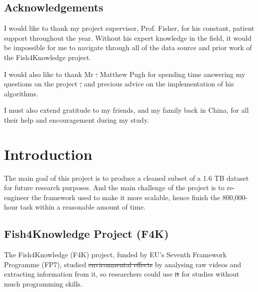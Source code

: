 \documentclass[bsc,logo,twoside,fullspacing,parskip]{infthesis}
\providecommand{\DIFadd}[1]{{\protect\color{blue}\uwave{#1}}} %
\providecommand{\DIFdel}[1]{{\protect\color{red}\sout{#1}}}                      %
\providecommand{\DIFaddbegin}{} %
\providecommand{\DIFaddend}{} %
\providecommand{\DIFdelbegin}{} %
\providecommand{\DIFdelend}{} %
\newcommand{\DIFscaledelfig}{0.5}
\newlength{\DIFdelgraphicswidth} %
\newlength{\DIFdelgraphicsheight} %
\newcommand{\DIFaddincludegraphics}[2][]{{\color{blue}\fbox{\DIFOincludegraphics[#1]{#2}}}} %
\newcommand{\DIFdelincludegraphics}[2][]{%
\sbox{\DIFdelgraphicsbox}{\DIFOincludegraphics[#1]{#2}}%
\settoboxwidth{\DIFdelgraphicswidth}{\DIFdelgraphicsbox} %
\settoboxtotalheight{\DIFdelgraphicsheight}{\DIFdelgraphicsbox} %
\scalebox{\DIFscaledelfig}{%
\parbox[b]{\DIFdelgraphicswidth}{\usebox{\DIFdelgraphicsbox}\\[-\baselineskip] \rule{\DIFdelgraphicswidth}{0em}}\llap{\resizebox{\DIFdelgraphicswidth}{\DIFdelgraphicsheight}{%
\setlength{\unitlength}{\DIFdelgraphicswidth}%
\begin{picture}(1,1)%
\thicklines\linethickness{2pt} %
{\color[rgb]{1,0,0}\put(0,0){\framebox(1,1){}}}%
{\color[rgb]{1,0,0}\put(0,0){\line( 1,1){1}}}%
{\color[rgb]{1,0,0}\put(0,1){\line(1,-1){1}}}%
\end{picture}%
}\hspace*{3pt}}} %
} %
\DeclareRobustCommand{\DIFaddbegin}{\DIFOaddbegin \let\includegraphics\DIFaddincludegraphics} %
\DeclareRobustCommand{\DIFaddend}{\DIFOaddend \let\includegraphics\DIFOincludegraphics} %
\DeclareRobustCommand{\DIFdelbegin}{\DIFOdelbegin \let\includegraphics\DIFdelincludegraphics} %
\DeclareRobustCommand{\DIFdelend}{\DIFOaddend \let\includegraphics\DIFOincludegraphics} %
\begin{document}
\maketitle

\section*{Acknowledgements}
I would like to thank my project supervisor, Prof. Fisher, for his constant, patient support throughout the year. Without his expert knowledge in the field, it would be impossible for me to navigate through all of the data source and prior work of the Fish4Knowledge project. 

I would also like to thank Mr \DIFdelbegin \DIFdel{. }\DIFdelend Matthew Pugh for spending time answering my questions on the project \DIFdelbegin \DIFdel{, }\DIFdelend and precious advice on the implementation of his algorithms.

I must also extend gratitude to my friends, and my family back in China, for all their help and encouragement during my study.

\newpage

\standarddeclaration

\tableofcontents



\chapter{Introduction}


The main goal of this project is to produce a cleaned subset of a 1.6 TB dataset for future research purposes. And the main challenge of the project is to re-engineer the framework used to make it more scalable, hence finish the 800,000-hour task within a reasonable amount of time.

\section{Fish4Knowledge Project (F4K)}

The Fish4Knowledge (F4K) project, funded by EU's Seventh Framework Programme (FP7), studied \DIFdelbegin \DIFdel{environmental effects }\DIFdelend \DIFaddbegin \DIFadd{ecological issues }\DIFaddend by analysing raw videos and extracting information from it, so researchers could use \DIFdelbegin \DIFdel{it }\DIFdelend \DIFaddbegin \DIFadd{the data }\DIFaddend for studies without much programming skills. 
\end{document}
